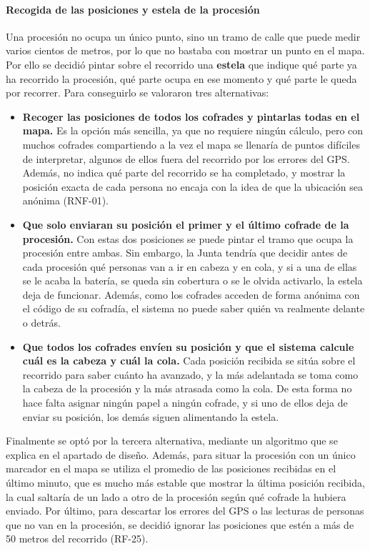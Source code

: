 \paragraph{Recogida de las posiciones y estela de la procesión}
Una procesión no ocupa un único punto, sino un tramo de calle que puede medir varios cientos de metros, por lo que no bastaba con mostrar un punto en el mapa. Por ello se decidió pintar sobre el recorrido una \textbf{estela} que indique qué parte ya ha recorrido la procesión, qué parte ocupa en ese momento y qué parte le queda por recorrer. Para conseguirlo se valoraron tres alternativas:
\begin{itemize}
    \item \textbf{Recoger las posiciones de todos los cofrades y pintarlas todas en el mapa.} Es la opción más sencilla, ya que no requiere ningún cálculo, pero con muchos cofrades compartiendo a la vez el mapa se llenaría de puntos difíciles de interpretar, algunos de ellos fuera del recorrido por los errores del GPS. Además, no indica qué parte del recorrido se ha completado, y mostrar la posición exacta de cada persona no encaja con la idea de que la ubicación sea anónima (RNF-01).
    \item \textbf{Que solo enviaran su posición el primer y el último cofrade de la procesión.} Con estas dos posiciones se puede pintar el tramo que ocupa la procesión entre ambas. Sin embargo, la Junta tendría que decidir antes de cada procesión qué personas van a ir en cabeza y en cola, y si a una de ellas se le acaba la batería, se queda sin cobertura o se le olvida activarlo, la estela deja de funcionar. Además, como los cofrades acceden de forma anónima con el código de su cofradía, el sistema no puede saber quién va realmente delante o detrás.
    \item \textbf{Que todos los cofrades envíen su posición y que el sistema calcule cuál es la cabeza y cuál la cola.} Cada posición recibida se sitúa sobre el recorrido para saber cuánto ha avanzado, y la más adelantada se toma como la cabeza de la procesión y la más atrasada como la cola. De esta forma no hace falta asignar ningún papel a ningún cofrade, y si uno de ellos deja de enviar su posición, los demás siguen alimentando la estela.
\end{itemize}
Finalmente se optó por la tercera alternativa, mediante un algoritmo que se explica en el apartado de diseño. Además, para situar la procesión con un único marcador en el mapa se utiliza el promedio de las posiciones recibidas en el último minuto, que es mucho más estable que mostrar la última posición recibida, la cual saltaría de un lado a otro de la procesión según qué cofrade la hubiera enviado. Por último, para descartar los errores del GPS o las lecturas de personas que no van en la procesión, se decidió ignorar las posiciones que estén a más de 50 metros del recorrido (RF-25).

